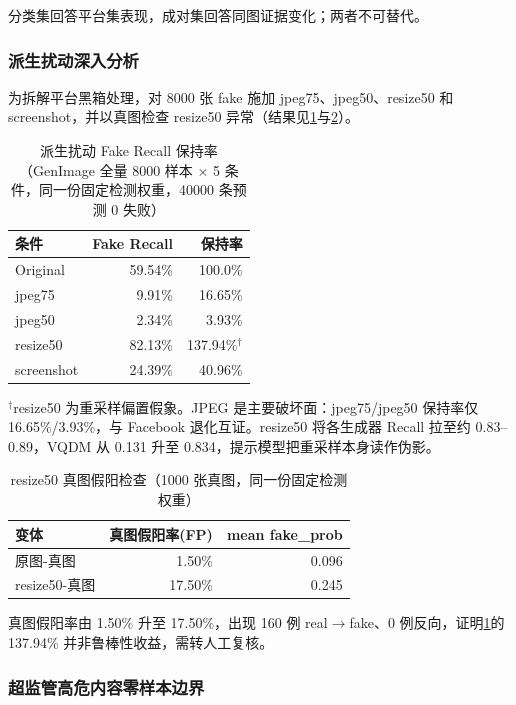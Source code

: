 \documentclass[UTF8, a4paper, 12pt]{ctexart}
\begin{document}
分类集回答平台集表现，成对集回答同图证据变化；两者不可替代。

\subsubsection{派生扰动深入分析}

为拆解平台黑箱处理，对 8000 张 fake 施加 jpeg75、jpeg50、resize50 和 screenshot，并以真图检查 resize50 异常（结果见\cref{tab:table34}与\cref{tab:table35}）。

\begin{table}[H]
\centering
\caption{派生扰动 Fake Recall 保持率（GenImage 全量 8000 样本 × 5 条件，同一份固定检测权重，40000 条预测 0 失败）}
\label{tab:table34}
\begin{tabular}{@{}lrr@{}}
\toprule
\textbf{条件} & \textbf{Fake Recall} & \textbf{保持率} \\
\midrule
Original & 59.54\% & 100.0\% \\
jpeg75 & 9.91\% & 16.65\% \\
jpeg50 & 2.34\% & 3.93\% \\
resize50 & 82.13\% & 137.94\%$^{\dagger}$ \\
screenshot & 24.39\% & 40.96\% \\
\bottomrule
\end{tabular}
\end{table}

$^{\dagger}$resize50 为重采样偏置假象。JPEG 是主要破坏面：jpeg75/jpeg50 保持率仅 16.65\%/3.93\%，与 Facebook 退化互证。resize50 将各生成器 Recall 拉至约 0.83--0.89，VQDM 从 0.131 升至 0.834，提示模型把重采样本身读作伪影。

\begin{table}[H]
\centering
\caption{resize50 真图假阳检查（1000 张真图，同一份固定检测权重）}
\label{tab:table35}
\begin{tabular}{@{}lrr@{}}
\toprule
\textbf{变体} & \textbf{真图假阳率(FP)} & \textbf{mean fake\_prob} \\
\midrule
原图-真图 & 1.50\% & 0.096 \\
resize50-真图 & 17.50\% & 0.245 \\
\bottomrule
\end{tabular}
\end{table}

真图假阳率由 1.50\% 升至 17.50\%，出现 160 例 real$\to$fake、0 例反向，证明\cref{tab:table34}的 137.94\% 并非鲁棒性收益，需转人工复核。

\subsubsection{超监管高危内容零样本边界}
\end{document}
